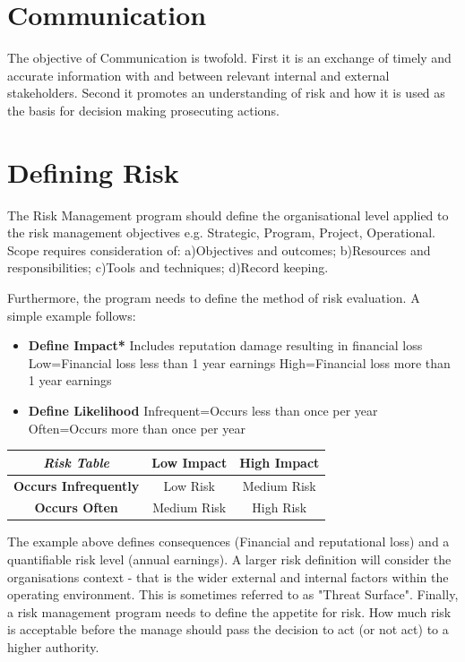 \section{Communication}
The objective of Communication is twofold. First it is an exchange of timely and accurate information with and between relevant internal and external stakeholders. Second it promotes an understanding of risk and how it is used as the basis for decision making prosecuting actions.
\section{Defining Risk}
The Risk Management program should define the organisational level applied to the risk management objectives e.g. Strategic, Program, Project, Operational.
Scope requires consideration of: a)Objectives and outcomes; b)Resources and responsibilities; c)Tools and techniques; d)Record keeping.

Furthermore, the program needs to define the method of risk evaluation. A simple example follows:
\begin{itemize}
	\item \textbf{Define Impact*}
	\subsubitem *Includes reputation damage resulting in financial loss
	\subitem Low=Financial loss less than 1 year earnings
	\subitem High=Financial loss more than 1 year earnings
	\item \textbf{Define Likelihood}
	\subitem Infrequent=Occurs less than once per year
	\subitem Often=Occurs more than once per year
\end{itemize}
\begin{table}[h]
	\centering
	\begin{tabular}{c|c|c}
	\textit{Risk Table} &\textbf{Low Impact} &\textbf{High Impact} \\
	\hline
	\textbf{Occurs Infrequently} &Low Risk &Medium Risk \\
	\textbf{Occurs Often} &Medium Risk &High Risk \\
	\end{tabular}
\end{table}
The example above defines consequences (Financial and reputational loss) and a quantifiable risk level (annual earnings). A larger risk definition will consider the organisations context - that is the wider external and internal factors within the operating environment. This is sometimes referred to as "Threat Surface". 
Finally, a risk management program needs to define the appetite for risk. How much risk is acceptable before the manage should pass the decision to act (or not act) to a higher authority.
